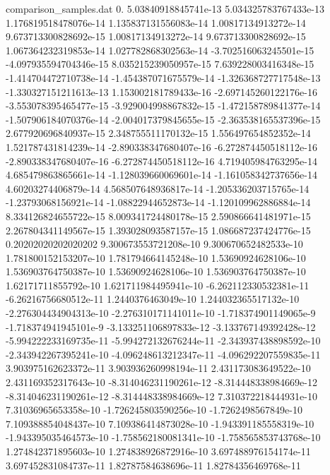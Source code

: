 \begin{filecontents}{comparison_samples.dat}
0.                  5.03840918845741e-13    5.034325783767433e-13   1.176819518478076e-14  1.135837131556083e-14  1.00817134913272e-14   9.673713300828692e-15  1.00817134913272e-14   9.673713300828692e-15  1.067364232319853e-14  1.027782868302563e-14  -3.702516063245501e-15  -4.097935594704346e-15  8.035215239050957e-15  7.639228003416348e-15  -1.414704472710738e-14  -1.454387071675579e-14  -1.326368727717548e-13  -1.330327151211613e-13  1.153002181789433e-16   -2.697145260122176e-16  -3.553078395465477e-15  -3.929004998867832e-15  -1.472158789841377e-14  -1.507906184070376e-14  -2.004017379845655e-15  -2.363538165537396e-15  2.677920696840937e-15  2.348755511170132e-15  1.556497654852352e-14  1.521787431814239e-14  -2.890338347680407e-16  -6.272874450518112e-16  -2.890338347680407e-16  -6.272874450518112e-16  4.719405984763295e-14  4.685479863865661e-14  -1.128039660069601e-14  -1.161058342737656e-14  4.60203274406879e-14   4.568507648936817e-14  -1.205336203715765e-14  -1.23793068156921e-14   -1.08822944652873e-14   -1.120109962886884e-14  8.334126824655722e-15  8.009341724480178e-15  2.590866641481971e-15  2.267804341149567e-15  1.393028093587157e-15   1.086687237424776e-15 
0.20202020202020202 9.300673553721208e-10   9.300670652482533e-10   1.781800152153207e-10  1.781794664145248e-10  1.53690924628106e-10   1.536903764750387e-10  1.53690924628106e-10   1.536903764750387e-10  1.62171711855792e-10   1.621711984495941e-10  -6.262112330532381e-11  -6.26216756680512e-11   1.2440376463049e-10    1.244032365517132e-10  -2.276304434904313e-10  -2.276310171141011e-10  -1.718374901149065e-9   -1.718374941945101e-9   -3.133251106897833e-12  -3.133767149392428e-12  -5.994222233169735e-11  -5.994272132676244e-11  -2.343937438898592e-10  -2.343942267395241e-10  -4.096248613212347e-11  -4.096292207559835e-11  3.903975162623372e-11  3.903936260998194e-11  2.431173083649522e-10  2.431169352317643e-10  -8.314046231190261e-12  -8.314448338984669e-12  -8.314046231190261e-12  -8.314448338984669e-12  7.310372218444931e-10  7.31036965653358e-10   -1.726245803590256e-10  -1.7262498567849e-10    7.109388854048437e-10  7.109386414873028e-10  -1.943391185558319e-10  -1.943395035464573e-10  -1.758562180081341e-10  -1.758565853743768e-10  1.274842371895603e-10  1.274838926872916e-10  3.697488976154174e-11  3.697452831084737e-11  1.82787584638696e-11    1.82784356469768e-11  

\end{filecontents}
